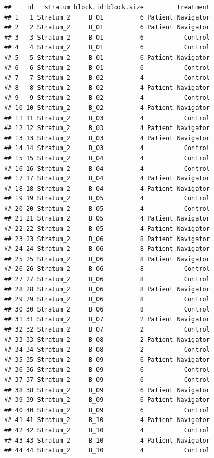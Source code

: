\documentclass[
]{book}
\begin{document}
\begin{verbatim}
##    id   stratum block.id block.size         treatment
## 1   1 Stratum_2     B_01          6 Patient Navigator
## 2   2 Stratum_2     B_01          6 Patient Navigator
## 3   3 Stratum_2     B_01          6           Control
## 4   4 Stratum_2     B_01          6           Control
## 5   5 Stratum_2     B_01          6 Patient Navigator
## 6   6 Stratum_2     B_01          6           Control
## 7   7 Stratum_2     B_02          4           Control
## 8   8 Stratum_2     B_02          4 Patient Navigator
## 9   9 Stratum_2     B_02          4           Control
## 10 10 Stratum_2     B_02          4 Patient Navigator
## 11 11 Stratum_2     B_03          4           Control
## 12 12 Stratum_2     B_03          4 Patient Navigator
## 13 13 Stratum_2     B_03          4 Patient Navigator
## 14 14 Stratum_2     B_03          4           Control
## 15 15 Stratum_2     B_04          4           Control
## 16 16 Stratum_2     B_04          4           Control
## 17 17 Stratum_2     B_04          4 Patient Navigator
## 18 18 Stratum_2     B_04          4 Patient Navigator
## 19 19 Stratum_2     B_05          4           Control
## 20 20 Stratum_2     B_05          4           Control
## 21 21 Stratum_2     B_05          4 Patient Navigator
## 22 22 Stratum_2     B_05          4 Patient Navigator
## 23 23 Stratum_2     B_06          8 Patient Navigator
## 24 24 Stratum_2     B_06          8 Patient Navigator
## 25 25 Stratum_2     B_06          8 Patient Navigator
## 26 26 Stratum_2     B_06          8           Control
## 27 27 Stratum_2     B_06          8           Control
## 28 28 Stratum_2     B_06          8 Patient Navigator
## 29 29 Stratum_2     B_06          8           Control
## 30 30 Stratum_2     B_06          8           Control
## 31 31 Stratum_2     B_07          2 Patient Navigator
## 32 32 Stratum_2     B_07          2           Control
## 33 33 Stratum_2     B_08          2 Patient Navigator
## 34 34 Stratum_2     B_08          2           Control
## 35 35 Stratum_2     B_09          6 Patient Navigator
## 36 36 Stratum_2     B_09          6           Control
## 37 37 Stratum_2     B_09          6           Control
## 38 38 Stratum_2     B_09          6 Patient Navigator
## 39 39 Stratum_2     B_09          6 Patient Navigator
## 40 40 Stratum_2     B_09          6           Control
## 41 41 Stratum_2     B_10          4 Patient Navigator
## 42 42 Stratum_2     B_10          4           Control
## 43 43 Stratum_2     B_10          4 Patient Navigator
## 44 44 Stratum_2     B_10          4           Control

\end{verbatim}
\end{document}

